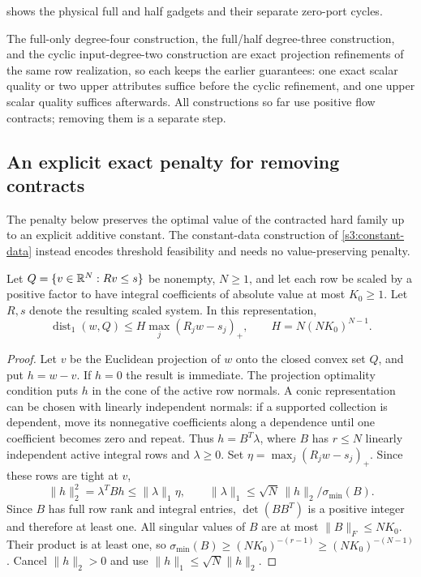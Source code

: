  shows the physical full and half gadgets and
their separate zero-port cycles.


The full-only degree-four construction, the full/half degree-three
construction, and the cyclic input-degree-two construction are exact
projection refinements of the same row realization, so each keeps the
earlier guarantees: one exact scalar quality or two upper attributes
suffice before the cyclic refinement, and one upper scalar quality
suffices afterwards. All constructions so far use positive flow
contracts; removing them is a separate step.

\subsection{An explicit exact penalty for removing contracts}\label{s3:penalty}

The penalty below preserves the optimal value of the contracted hard
family up to an explicit additive constant. The constant-data
construction of \cref{s3:constant-data} instead encodes threshold
feasibility and needs no value-preserving penalty.

\begin{lemma}\label{s3:hoffman}
Let $Q=\{v\in\mathbb R^N:Rv\le s\}$ be nonempty, $N\ge1$, and let each row
be scaled by a positive factor to have integral coefficients of absolute
value at most $K_0\ge1$. Let $R,s$ denote the resulting scaled system. In this representation,
\begin{equation}
 \operatorname{dist}_1(w,Q)\le H\max_j(R_jw-s_j)_+,
 \qquad H=N(NK_0)^{N-1}.\label{s3:hoffman-bound}
\end{equation}
\end{lemma}
\begin{proof}
Let $v$ be the Euclidean projection of $w$ onto the closed convex set
$Q$, and put $h=w-v$. If $h=0$ the result is immediate. The projection
optimality condition puts $h$ in the cone of the active row normals.
A conic representation can be chosen with linearly independent normals:
if a supported collection is dependent, move its nonnegative coefficients
along a dependence until one coefficient becomes zero and repeat. Thus
$h=B^T\lambda$, where $B$ has $r\le N$ linearly independent active
integral rows and $\lambda\ge0$. Set
$\eta=\max_j(R_jw-s_j)_+$. Since these rows are tight at $v$,
\[
 \|h\|_2^2=\lambda^TBh\le\|\lambda\|_1\eta,
 \qquad
 \|\lambda\|_1\le\sqrt N\,\|h\|_2/\sigma_{\min}(B).
\]
Since $B$ has full row rank and integral entries, $\det(BB^T)$ is
a positive integer and therefore at least one. All singular values
of $B$ are at most $\|B\|_F\le NK_0$. Their product is at least one,
so $\sigma_{\min}(B)\ge(NK_0)^{-(r-1)}\ge(NK_0)^{-(N-1)}$.
Cancel $\|h\|_2>0$ and use $\|h\|_1\le\sqrt N\|h\|_2$.
\end{proof}

